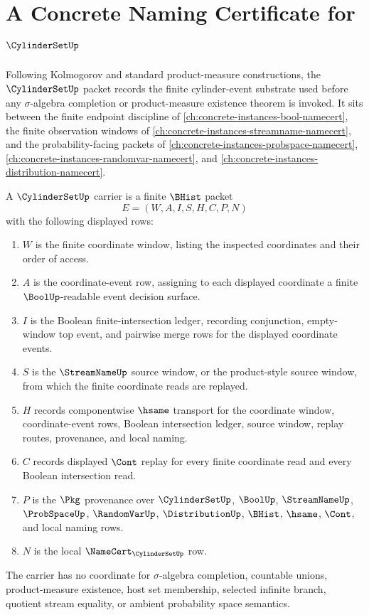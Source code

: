 \chapter{A Concrete Naming Certificate for $\CylinderSetUp$}
\label{ch:concrete-instances-cylinder-set-namecert}

Following Kolmogorov and standard product-measure constructions, the $\CylinderSetUp$ packet records the finite cylinder-event substrate used before any $\sigma$-algebra completion or product-measure existence theorem is invoked. It sits between the finite endpoint discipline of \autoref{ch:concrete-instances-bool-namecert}, the finite observation windows of \autoref{ch:concrete-instances-streamname-namecert}, and the probability-facing packets of \autoref{ch:concrete-instances-probspace-namecert}, \autoref{ch:concrete-instances-randomvar-namecert}, and \autoref{ch:concrete-instances-distribution-namecert}.

\begin{definition}
\label{def:cylinder-set-carrier}
A $\CylinderSetUp$ carrier is a finite $\BHist$ packet
$$
E=(W,A,I,S,H,C,P,N)
$$
with the following displayed rows:
\begin{enumerate}
\item $W$ is the finite coordinate window, listing the inspected coordinates and their order of access.
\item $A$ is the coordinate-event row, assigning to each displayed coordinate a finite $\BoolUp$-readable event decision surface.
\item $I$ is the Boolean finite-intersection ledger, recording conjunction, empty-window top event, and pairwise merge rows for the displayed coordinate events.
\item $S$ is the $\StreamNameUp$ source window, or the product-style source window, from which the finite coordinate reads are replayed.
\item $H$ records componentwise $\hsame$ transport for the coordinate window, coordinate-event rows, Boolean intersection ledger, source window, replay routes, provenance, and local naming.
\item $C$ records displayed $\Cont$ replay for every finite coordinate read and every Boolean intersection read.
\item $P$ is the $\Pkg$ provenance over $\CylinderSetUp$, $\BoolUp$, $\StreamNameUp$, $\ProbSpaceUp$, $\RandomVarUp$, $\DistributionUp$, $\BHist$, $\hsame$, $\Cont$, and local naming rows.
\item $N$ is the local $\NameCert_{\CylinderSetUp}$ row.
\end{enumerate}
The carrier has no coordinate for $\sigma$-algebra completion, countable unions, product-measure existence, host set membership, selected infinite branch, quotient stream equality, or ambient probability space semantics.
\end{definition}

